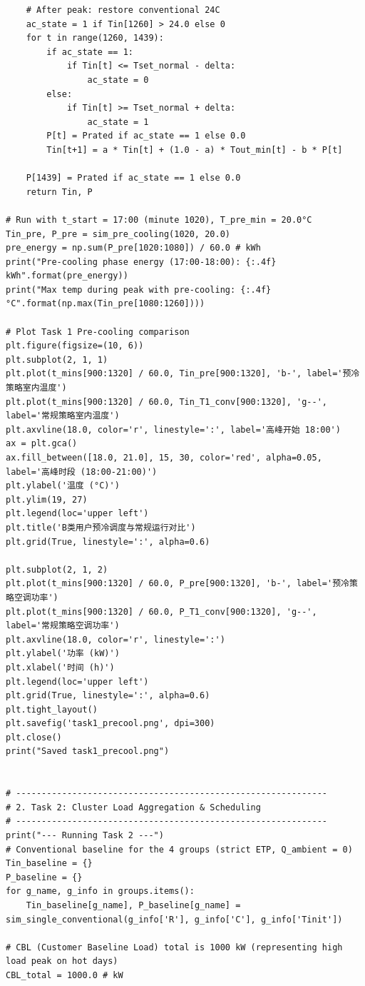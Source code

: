 \documentclass[12pt,a4paper]{article}
\begin{document}
\begin{lstlisting}
    # After peak: restore conventional 24C
    ac_state = 1 if Tin[1260] > 24.0 else 0
    for t in range(1260, 1439):
        if ac_state == 1:
            if Tin[t] <= Tset_normal - delta:
                ac_state = 0
        else:
            if Tin[t] >= Tset_normal + delta:
                ac_state = 1
        P[t] = Prated if ac_state == 1 else 0.0
        Tin[t+1] = a * Tin[t] + (1.0 - a) * Tout_min[t] - b * P[t]
        
    P[1439] = Prated if ac_state == 1 else 0.0
    return Tin, P

# Run with t_start = 17:00 (minute 1020), T_pre_min = 20.0°C
Tin_pre, P_pre = sim_pre_cooling(1020, 20.0)
pre_energy = np.sum(P_pre[1020:1080]) / 60.0 # kWh
print("Pre-cooling phase energy (17:00-18:00): {:.4f} kWh".format(pre_energy))
print("Max temp during peak with pre-cooling: {:.4f} °C".format(np.max(Tin_pre[1080:1260])))

# Plot Task 1 Pre-cooling comparison
plt.figure(figsize=(10, 6))
plt.subplot(2, 1, 1)
plt.plot(t_mins[900:1320] / 60.0, Tin_pre[900:1320], 'b-', label='预冷策略室内温度')
plt.plot(t_mins[900:1320] / 60.0, Tin_T1_conv[900:1320], 'g--', label='常规策略室内温度')
plt.axvline(18.0, color='r', linestyle=':', label='高峰开始 18:00')
ax = plt.gca()
ax.fill_between([18.0, 21.0], 15, 30, color='red', alpha=0.05, label='高峰时段 (18:00-21:00)')
plt.ylabel('温度 (°C)')
plt.ylim(19, 27)
plt.legend(loc='upper left')
plt.title('B类用户预冷调度与常规运行对比')
plt.grid(True, linestyle=':', alpha=0.6)

plt.subplot(2, 1, 2)
plt.plot(t_mins[900:1320] / 60.0, P_pre[900:1320], 'b-', label='预冷策略空调功率')
plt.plot(t_mins[900:1320] / 60.0, P_T1_conv[900:1320], 'g--', label='常规策略空调功率')
plt.axvline(18.0, color='r', linestyle=':')
plt.ylabel('功率 (kW)')
plt.xlabel('时间 (h)')
plt.legend(loc='upper left')
plt.grid(True, linestyle=':', alpha=0.6)
plt.tight_layout()
plt.savefig('task1_precool.png', dpi=300)
plt.close()
print("Saved task1_precool.png")


# -------------------------------------------------------------
# 2. Task 2: Cluster Load Aggregation & Scheduling
# -------------------------------------------------------------
print("--- Running Task 2 ---")
# Conventional baseline for the 4 groups (strict ETP, Q_ambient = 0)
Tin_baseline = {}
P_baseline = {}
for g_name, g_info in groups.items():
    Tin_baseline[g_name], P_baseline[g_name] = sim_single_conventional(g_info['R'], g_info['C'], g_info['Tinit'])

# CBL (Customer Baseline Load) total is 1000 kW (representing high load peak on hot days)
CBL_total = 1000.0 # kW


\end{lstlisting}
\end{document}
